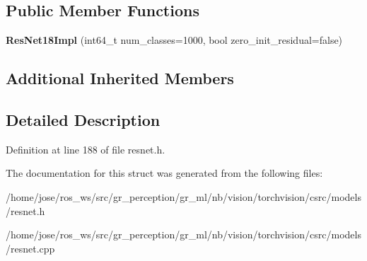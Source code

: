 \subsection*{Public Member Functions}
\begin{DoxyCompactItemize}
\item 
\mbox{\label{structvision_1_1models_1_1ResNet18Impl_ad1ef97c1d97e4e097ece1de08cd192e4}} 
{\bfseries Res\+Net18\+Impl} (int64\+\_\+t num\+\_\+classes=1000, bool zero\+\_\+init\+\_\+residual=false)
\end{DoxyCompactItemize}
\subsection*{Additional Inherited Members}


\subsection{Detailed Description}


Definition at line 188 of file resnet.\+h.



The documentation for this struct was generated from the following files\+:\begin{DoxyCompactItemize}
\item 
/home/jose/ros\+\_\+ws/src/gr\+\_\+perception/gr\+\_\+ml/nb/vision/torchvision/csrc/models/resnet.\+h\item 
/home/jose/ros\+\_\+ws/src/gr\+\_\+perception/gr\+\_\+ml/nb/vision/torchvision/csrc/models/resnet.\+cpp\end{DoxyCompactItemize}
